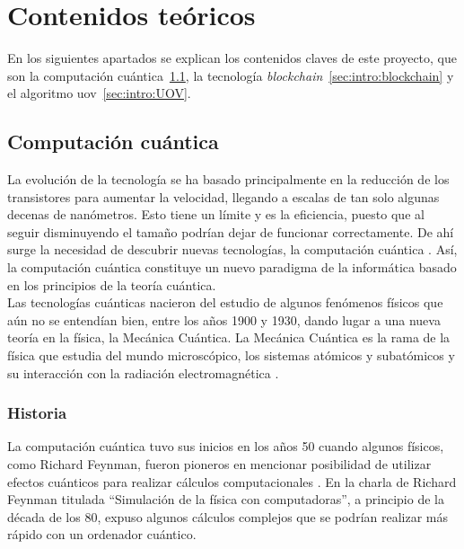 \chapter{Contenidos teóricos}

En los siguientes apartados se explican los contenidos claves de este proyecto, que son la computación cuántica\ \ref{sec:intro:cc}, la tecnología \textit{blockchain}\ \ref{sec:intro:blockchain} y el algoritmo \acrshort{uov}\ \ref{sec:intro:UOV}.

\section{Computación cuántica}\label{sec:intro:cc}

La evolución de la tecnología se ha basado principalmente en la reducción de los transistores para aumentar la velocidad, llegando a escalas de tan solo algunas decenas de nanómetros. Esto tiene un límite y es la eficiencia, puesto que al seguir disminuyendo el tamaño podrían dejar de funcionar correctamente. De ahí surge la necesidad de descubrir nuevas tecnologías, la computación cuántica \cite{computacion-cuantica-wiki}. Así, la computación cuántica constituye un nuevo paradigma de la informática basado en los principios de la teoría cuántica.\\

Las tecnologías cuánticas nacieron del estudio de algunos fenómenos físicos que aún no se entendían bien, entre los años 1900 y 1930, dando lugar a una nueva teoría en la física, la Mecánica Cuántica. La Mecánica Cuántica es la rama de la física que estudia del mundo microscópico, los sistemas atómicos y subatómicos y su interacción con la radiación electromagnética \cite{mecanica-cuantica}.

\subsection{Historia}

La computación cuántica tuvo sus inicios en los años 50 cuando algunos físicos, como Richard Feynman, fueron pioneros en mencionar posibilidad de utilizar efectos cuánticos para realizar cálculos computacionales \cite{computacion-cuantica-wiki}. En la charla de Richard Feynman titulada ``Simulación de la física con computadoras'', a principio de la década de los 80, expuso algunos cálculos complejos que se podrían realizar más rápido con un ordenador cuántico. \\


